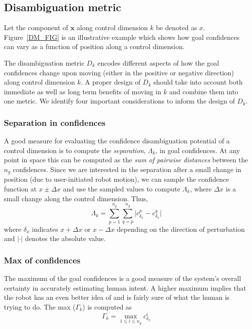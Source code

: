 \documentclass[conference]{IEEEtran}
\begin{document}
\subsection{Disambiguation metric}\label{DM}
Let the component of $\boldsymbol{x}$ along control dimension $k$ be denoted as $x$. 
Figure~\ref{DM_FIG} is an illustrative example which shows how goal confidences can vary as a function of position along a control dimension. 

The disambiguation metric $D_{k}$ encodes different aspects of how the goal confidences change upon moving (either in the positive or negative direction) along control dimension $k$. A proper design of $D_{k}$ should take into account both immediate as well as long term benefits of moving in $k$ and combine them into one metric. We identify four important considerations to  inform the design of $D_{k}$.

\subsubsection{Separation in confidences}
A good measure for evaluating the confidence disambiguation potential of a control dimension is to compute the \textit{separation}, $\Lambda_{k}$, in goal confidences. At any point in space this can be computed as the \textit{sum of pairwise distances} between the $n_g$ confidences. Since we are interested in the separation after a small change in position (due to user-initiated robot motion), we can sample the confidence function at $x\pm\Delta x$ and use the sampled values to compute $\Lambda_{k}$, where $\Delta x$ is a small change along the control dimension. Thus,
\begin{equation*}
\Lambda_{k} = \sum_{p=1}^{n_g}\sum_{q=p}^{n_g}\lvert c^{p}_{\delta_x} - c^{q}_{\delta_x}\rvert
\end{equation*}
where $\delta_x$ indicates $x+\Delta x$ or $x-\Delta x$ depending on the direction of perturbation and $\lvert\cdot\rvert$ denotes the absolute value. 
\subsubsection{Max of confidences}
The maximum of the goal confidences is a good measure of the system's overall certainty in accurately estimating human intent. A higher maximum implies that the robot has an even better idea of and is fairly sure of what the human is trying to do. The max ($\Gamma_{k}$) is computed as
\begin{equation*}
\Gamma_{k} =\max\limits_{1 \leq i \leq n_g}c^{i}_{\delta_x}
\end{equation*}
\end{document}
